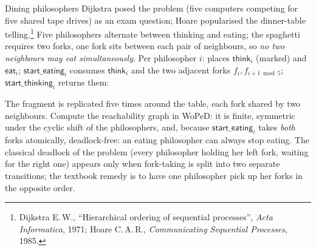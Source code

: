\begin{examplebox}{Dining philosophers}
Dijkstra posed the problem (five computers competing for five shared tape drives) as an exam question; Hoare popularised the dinner-table telling.\footnote{Dijkstra E.\,W., ``Hierarchical ordering of sequential processes'', \emph{Acta Informatica}, 1971; Hoare C.\,A.\,R., \emph{Communicating Sequential Processes}, 1985.} Five philosophers alternate between thinking and eating; the spaghetti requires two forks, one fork sits between each pair of neighbours, so \emph{no two neighbours may eat simultaneously}. Per philosopher $i$: places $\textsf{think}_i$ (marked) and $\textsf{eat}_i$; $\textsf{start\_eating}_i$ consumes $\textsf{think}_i$ and the two adjacent forks $f_i, f_{i+1 \bmod 5}$; $\textsf{start\_thinking}_i$ returns them:
\begin{center}
\end{center}
The fragment is replicated five times around the table, each fork shared by two neighbours. Compute the reachability graph in WoPeD: it is finite, symmetric under the cyclic shift of the philosophers, and, because $\textsf{start\_eating}_i$ takes \emph{both} forks atomically, deadlock-free: an eating philosopher can always stop eating. The classical deadlock of the problem (every philosopher holding her left fork, waiting for the right one) appears only when fork-taking is split into two separate transitions; the textbook remedy is to have one philosopher pick up her forks in the opposite order.
\end{examplebox}

